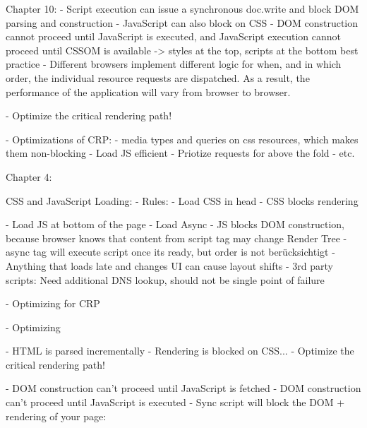 
Chapter 10:
- Script execution can issue a synchronous doc.write and block DOM parsing and construction
- JavaScript can also block on CSS
- DOM construction cannot proceed until JavaScript is executed, and JavaScript execution cannot proceed until CSSOM is available
-> styles at the top, scripts at the bottom best practice
- Different browsers implement different logic for when, and in which order, the individual resource requests are dispatched. As a result, the performance of the application will vary from browser to browser.


- Optimize the critical rendering path!


- Optimizations of CRP:
- media types and queries on css resources, which makes them non-blocking
- Load JS efficient
- Priotize requests for above the fold
- etc. %

Chapter 4:

CSS and JavaScript Loading:
- Rules:
- Load CSS in head
- CSS blocks rendering

- Load JS at bottom of the page
- Load Async
- JS blocks DOM construction, because browser knows that content from script tag may change Render Tree
- async tag will execute script once its ready, but order is not berücksichtigt
- Anything that loads late and changes UI can cause layout shifts
- 3rd party scripts: Need additional DNS lookup, should not be single point of failure


- Optimizing for CRP


- Optimizing


-  HTML is parsed incrementally
- Rendering is blocked on CSS...
- Optimize the critical rendering path!

- DOM construction can't proceed until JavaScript is fetched
- DOM construction can't proceed until JavaScript is executed
- Sync script will block the DOM + rendering of your page:

